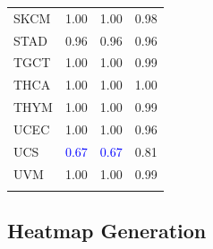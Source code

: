 \begin{table}[h!]
{\begin{tabular}{lrrr}
     SKCM &  1.00 & 1.00 & 0.98 \\ 
     STAD &  0.96 & 0.96 & 0.96 \\ 
     TGCT &  1.00 & 1.00 & 0.99 \\ 
     THCA &  1.00 & 1.00 & 1.00 \\ 
     THYM &  1.00 & 1.00 & 0.99 \\ 
     UCEC &  1.00 & 1.00 & 0.96 \\ 
     UCS  &  \textcolor{blue}{0.67} & \textcolor{blue}{0.67} & 0.81 \\ 
     UVM  &  1.00 & 1.00 & 0.99 \\ 
    \bottomrule
    \label{tab:CPU-res}
    \end{tabular} 
    } %
\end{table}


\subsection{Heatmap Generation}
